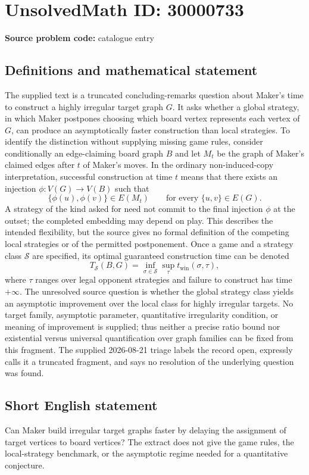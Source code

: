 \documentclass[11pt]{article}
\begin{document}
\section*{UnsolvedMath ID: 30000733}
\textbf{Source problem code:} catalogue entry
\subsection{Definitions and mathematical statement}
The supplied text is a truncated concluding-remarks question about Maker's time to construct a highly irregular target graph $G$. It asks whether a global strategy, in which Maker postpones choosing which board vertex represents each vertex of $G$, can produce an asymptotically faster construction than local strategies. To identify the distinction without supplying missing game rules, consider conditionally an edge-claiming board graph $B$ and let $M_t$ be the graph of Maker's claimed edges after $t$ of Maker's moves. In the ordinary non-induced-copy interpretation, successful construction at time $t$ means that there exists an injection $\phi:V(G)\to V(B)$ such that \[\{\phi(u),\phi(v)\}\in E(M_t)\qquad\text{for every }\{u,v\}\in E(G).\] A strategy of the kind asked for need not commit to the final injection $\phi$ at the outset; the completed embedding may depend on play. This describes the intended flexibility, but the source gives no formal definition of the competing local strategies or of the permitted postponement. Once a game and a strategy class $\mathcal S$ are specified, its optimal guaranteed construction time can be denoted \[T_{\mathcal S}(B,G)=\inf_{\sigma\in\mathcal S}\sup_{\tau}t_{\mathrm{win}}(\sigma,\tau),\] where $\tau$ ranges over legal opponent strategies and failure to construct has time $+\infty$. The unresolved source question is whether the global strategy class yields an asymptotic improvement over the local class for highly irregular targets. No target family, asymptotic parameter, quantitative irregularity condition, or meaning of improvement is supplied; thus neither a precise ratio bound nor existential versus universal quantification over graph families can be fixed from this fragment. The supplied 2026-08-21 triage labels the record open, expressly calls it a truncated fragment, and says no resolution of the underlying question was found.
\subsection{Short English statement}
Can Maker build irregular target graphs faster by delaying the assignment of target vertices to board vertices? The extract does not give the game rules, the local-strategy benchmark, or the asymptotic regime needed for a quantitative conjecture.
\end{document}
